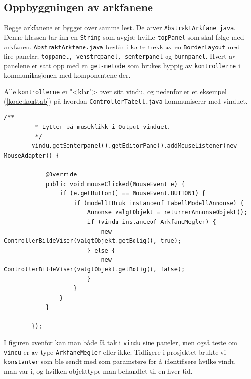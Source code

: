 \subsection{Oppbyggningen av arkfanene}
Begge arkfanene er bygget over samme lest. De arver \texttt{AbstraktArkfane.java}. Denne klassen tar inn en \texttt{String} som avgjør hvilke \texttt{topPanel} som skal følge med arkfanen.
\texttt{AbstraktArkfane.java} består i korte trekk av en \texttt{BorderLayout} med fire paneler; \texttt{toppanel, venstrepanel, senterpanel} og \texttt{bunnpanel}.
Hvert av panelene er satt opp med en \texttt{get-metode} som brukes hyppig av \texttt{kontrollerne} i kommunikasjonen med komponentene der.

Alle \texttt{kontrollerne} er "<klar"> over sitt vindu, og nedenfor er et eksempel (\ref{kode:konttab}) på hvordan \texttt{ControllerTabell.java} kommuniserer med vinduet.

\begin{lstlisting}[caption={[\texttt{ControllerTabell.java}]\texttt{ControllerTabell.java} kommunikasjon med brukergrensesnitt.},label=kode:konttab]
        /**
         * Lytter på museklikk i Output-vinduet.
         */
        vindu.getSenterpanel().getEditorPane().addMouseListener(new MouseAdapter() {

            @Override
            public void mouseClicked(MouseEvent e) {
                if (e.getButton() == MouseEvent.BUTTON1) {
                    if (modellIBruk instanceof TabellModellAnnonse) {
                        Annonse valgtObjekt = returnerAnnonseObjekt();
                        if (vindu instanceof ArkfaneMegler) {
                            new ControllerBildeViser(valgtObjekt.getBolig(), true);
                        } else {
                            new ControllerBildeViser(valgtObjekt.getBolig(), false);
                        }
                    }
                }
            }

        });
\end{lstlisting}

I figuren ovenfor kan man både få tak i \texttt{vindu} sine paneler, men også teste om \texttt{vindu} er av type \texttt{ArkfaneMegler} eller ikke. Tidligere i prosjektet brukte vi \texttt{konstanter} som ble sendt med som parametere for å identifisere hvilke vindu man var i, og hvilken objekttype man behandlet til en hver tid.


